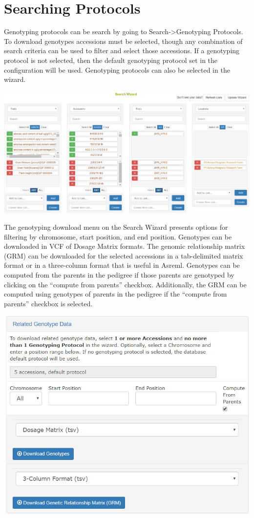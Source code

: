 \documentclass[
  12pt,
]{book}
\begin{document}
\hypertarget{searching-protocols}{%
\section{Searching Protocols}\label{searching-protocols}}

Genotyping protocols can be search by going to Search-\textgreater Genotyping Protocols. To download genotypes accessions must be selected, though any combination of search criteria can be used to filter and select those accessions. If a genotyping protocol is not selected, then the default genotyping protocol set in the configuration will be used. Genotyping protocols can also be selected in the wizard.

\begin{center}\includegraphics[width=0.95\linewidth]{assets/images/search_wizard_genotyping_protocols_download_main} \end{center}

The genotyping download menu on the Search Wizard presents options for filtering by chromosome, start position, and end position. Genotypes can be downloaded in VCF of Dosage Matrix formats. The genomic relationship matrix (GRM) can be downloaded for the selected accessions in a tab-delimited matrix format or in a three-column format that is useful in Asreml. Genotypes can be computed from the parents in the pedigree if those parents are genotyped by clicking on the ``compute from parents'' checkbox. Additionally, the GRM can be computed using genotypes of parents in the pedigree if the ``compute from parents'' checkbox is selected.

\begin{center}\includegraphics[width=0.75\linewidth]{assets/images/search_wizard_genotyping_protocols_download_genotypes} \end{center}
\end{document}
